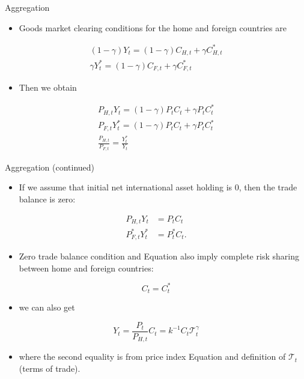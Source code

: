 \documentclass[10pt]{beamer}
\begin{document}
\begin{frame}{Aggregation}

\begin{itemize}
    \item Goods market clearing conditions for 
     the home and foreign countries are
\end{itemize}
\begin{gather*}
(1-\gamma) Y_{t}=(1-\gamma)C_{H, t}+\gamma C_{H, t}^{*} \\
\gamma Y_{t}^{*}=(1-\gamma)C_{F, t}+\gamma C_{F, t}^{*}
\end{gather*}
\begin{itemize}
    \item Then we obtain
\end{itemize}
\begin{gather*}
P_{H, t} Y_{t}=(1-\gamma)P_{t}C_{t}+\gamma P_{t}C_{t}^{*} \\
P_{F, t} Y_{t}^{*}=(1-\gamma) P_{t}C_{t}+\gamma P_{t}C_{t}^{*} \\
\frac{P_{H, t}}{P_{F, t}}=\frac{Y_{t}^{*}}{Y_{t}}
\end{gather*}

\end{frame}

\begin{frame}{Aggregation (continued)}

\begin{itemize}
    \item If we assume that initial net international asset holding is 0, then the trade balance is zero:
\end{itemize}


$$
\begin{aligned}
P_{H, t} Y_{t} & =P_{t}C_{t} \\
P_{F, t}^{*} Y_{t}^{*} & =P_{t}^{*}C_{t} .
\end{aligned}
$$

\begin{itemize}
    \item Zero trade balance condition and Equation also imply complete risk sharing between home and foreign countries:
\end{itemize}


$$
C_{t}=C_{t}^{*}
$$

\begin{itemize}
    \item we can also get
\end{itemize}


$$
Y_{t}=\frac{P_{t}}{P_{H, t}}C_{t}=k^{-1}C_{t} \mathcal{T}_{t}^{\gamma}
$$

\begin{itemize}
    \item where the second equality is from price index Equation and definition of $\mathcal{T}_t$ (terms of trade).  
\end{itemize}
  
\end{frame}
\end{document}
